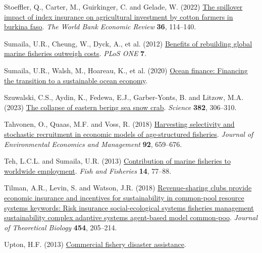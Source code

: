\documentclass[
  letterpaper,
  DIV=11,
  numbers=noendperiod]{scrartcl}
\newlength{\cslhangindent}
\newlength{\cslentryspacingunit} %
\newenvironment{CSLReferences}[2] %
 {%
  \setlength{\parindent}{0pt}
  \ifodd #1
  \let\oldpar\par
  \def\par{\hangindent=\cslhangindent\oldpar}
  \fi
  \setlength{\parskip}{#2\cslentryspacingunit}
 }%
 {}
\theoremstyle{plain}
\theoremstyle{plain}
\theoremstyle{remark}
\begin{document}
\begin{CSLReferences}{1}{0}
\leavevmode{}%
Stoeffler, Q., Carter, M., Guirkinger, C. and Gelade, W. (2022)
\href{https://doi.org/10.1093/wber}{The spillover impact of index
insurance on agricultural investment by cotton farmers in burkina faso}.
\emph{The World Bank Economic Review} \textbf{36}, 114--140.

\leavevmode{}%
Sumaila, U.R., Cheung, W., Dyck, A., et al. (2012)
\href{https://doi.org/10.1371/journal.pone.0040542}{Benefits of
rebuilding global marine fisheries outweigh costs}. \emph{PLoS ONE}
\textbf{7}.

\leavevmode{}%
Sumaila, U.R., Walsh, M., Hoareau, K., et al. (2020)
\href{https://www.oceanpanel.org/blue-}{Ocean finance: Financing the
transition to a sustainable ocean economy}.

\leavevmode{}%
Szuwalski, C.S., Aydin, K., Fedewa, E.J., Garber-Yonts, B. and Litzow,
M.A. (2023) \href{https://doi.org/10.1126/SCIENCE.ADF6035}{The collapse
of eastern bering sea snow crab}. \emph{Science} \textbf{382}, 306--310.

\leavevmode{}%
Tahvonen, O., Quaas, M.F. and Voss, R. (2018)
\href{https://doi.org/10.1016/j.jeem.2017.08.011}{Harvesting selectivity
and stochastic recruitment in economic models of age-structured
fisheries}. \emph{Journal of Environmental Economics and Management}
\textbf{92}, 659--676.

\leavevmode{}%
Teh, L.C.L. and Sumaila, U.R. (2013)
\href{https://doi.org/10.1111/j.1467-2979.2011.00450.x}{Contribution of
marine fisheries to worldwide employment}. \emph{Fish and Fisheries}
\textbf{14}, 77--88.

\leavevmode{}%
Tilman, A.R., Levin, S. and Watson, J.R. (2018)
\href{https://doi.org/10.1016/j.jtbi.2018.06.003}{Revenue-sharing clubs
provide economic insurance and incentives for sustainability in
common-pool resource systems keywords: Risk insurance social-ecological
systems fisheries management sustainability complex adaptive systems
agent-based model common-poo}. \emph{Journal of Theoretical Biology}
\textbf{454}, 205--214.

\leavevmode{}%
Upton, H.F. (2013) \href{https://www.crs.gov}{Commercial fishery
disaster assistance}.


\end{CSLReferences}
\end{document}
